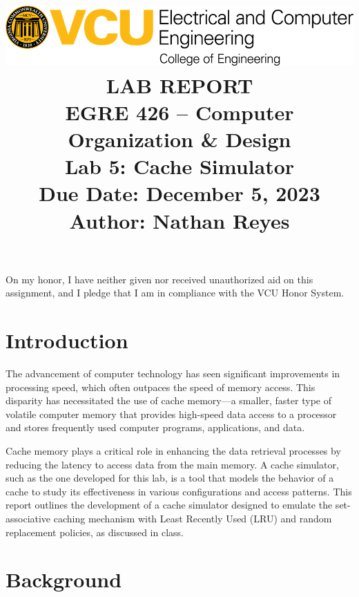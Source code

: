\documentclass[12pt]{article}
\title{
    \vspace*{-3cm}
    \includegraphics[width=1\textwidth]{VCULogo.png}\\
    \vspace{2cm}
    \textbf{\LARGE LAB REPORT}\\
    \vspace{1cm}
    \textbf{\LARGE EGRE 426 – Computer Organization \& Design}\\
    \vspace{1cm}
    \textbf{\LARGE Lab 5: Cache Simulator}\\
    Due Date: December 5, 2023\\
    \vspace{1cm}
    Author: Nathan Reyes\\
}
\date{}
\begin{document}
\maketitle

\vspace{8cm}

\noindent On my honor, I have neither given nor received unauthorized aid on this assignment, and I pledge that I am in compliance with the VCU Honor System.

\vspace{1cm}


\newpage
\pagestyle{fancy}
\fancyhf{} %
\renewcommand{\headrulewidth}{0pt}
\fancyfoot[C]{\thepage}

\vspace*{1cm}

\section{Introduction}

The advancement of computer technology has seen significant improvements in processing speed, which often outpaces the speed of memory access. This disparity has necessitated the use of cache memory—a smaller, faster type of volatile computer memory that provides high-speed data access to a processor and stores frequently used computer programs, applications, and data.

Cache memory plays a critical role in enhancing the data retrieval processes by reducing the latency to access data from the main memory. A cache simulator, such as the one developed for this lab, is a tool that models the behavior of a cache to study its effectiveness in various configurations and access patterns. This report outlines the development of a cache simulator designed to emulate the set-associative caching mechanism with Least Recently Used (LRU) and random replacement policies, as discussed in class.

\section{Background}
\end{document}
